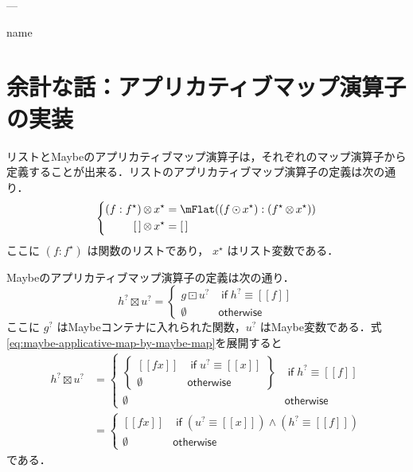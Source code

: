 \documentclass[a4paper]{jsbook}
\def\[{\left[\!\left[}
\def\]{\right]\!\right]}
\newcommand{\mMaybeWith}[1]{\[#1\]}
\newcommand{\mEmptyList}{{[\,]}}
\newcommand{\mNothing}{\emptyset}
\newcommand{\mKeyword}[1]{\mathsf{#1}}
\newcommand{\mIfKeyword}{\mKeyword{if}}
\newcommand{\mOtherwiseKeyword}{\mKeyword{otherwise}}
\newcommand{\mList}[1]{{#1}^\mathrm{\star}}
\newcommand{\mMaybe}[1]{{#1}^\text{?}}
\DeclareMathOperator{\mMapList}{\odot}
\DeclareMathOperator{\mMapMaybe}{\boxdot}
\DeclareMathOperator{\mAppMapList}{\otimes}
\DeclareMathOperator{\mAppMapMaybe}{\boxtimes}
\DeclareMathOperator{\mLogicalAnd}{\wedge}
\DeclareMathOperator{\mIf}{\mIfKeyword}
\DeclareMathOperator{\mOtherwise}{\mOtherwiseKeyword}
\begin{document}
---

name

\section{余計な話：アプリカティブマップ演算子の実装}

リストとMaybeのアプリカティブマップ演算子は，それぞれのマップ演算子から定義することが出来る．リストのアプリカティブマップ演算子の定義は次の通り．
\begin{equation}
\left\{
\begin{split}
(f:\mList{f})\mAppMapList\mList{x}&=\mFlat((f\mMapList\mList{x}):(\mList{f}\mAppMapList\mList{x}))\\
\mEmptyList\mAppMapList\mList{x}&=\mEmptyList
\end{split}
\right.
\end{equation}
ここに $(f:\mList{f})$ は関数のリストであり， $\mList{x}$ はリスト変数である．

Maybeのアプリカティブマップ演算子の定義は次の通り．
\begin{equation}
\label{eq:maybe-applicative-map-by-maybe-map}
\mMaybe{h}\mAppMapMaybe\mMaybe{u}
=\begin{cases}
g\mMapMaybe\mMaybe{u}&\mIf\mMaybe{h}\equiv\mMaybeWith{f}\\
\mNothing&\mOtherwise
\end{cases}
\end{equation}
ここに $\mMaybe{g}$ はMaybeコンテナに入れられた関数，$\mMaybe{u}$ はMaybe変数である．式\eqref{eq:maybe-applicative-map-by-maybe-map}を展開すると
\begin{align}
\mMaybe{h}\mAppMapMaybe\mMaybe{u}
&=\begin{cases}
\left\{
\begin{array}{ll}
\mMaybeWith{fx}&\mIf\mMaybe{u}\equiv\mMaybeWith{x}\\
\mNothing&\mOtherwise
\end{array}\right\}
&\mIf\mMaybe{h}\equiv\mMaybeWith{f}\\
\mNothing&\mOtherwise
\end{cases}\\
&=\begin{cases}
\mMaybeWith{fx}&\mIf\left(\mMaybe{u}\equiv\mMaybeWith{x}\right)\mLogicalAnd\left(\mMaybe{h}\equiv\mMaybeWith{f}\right)\\
\mNothing&\mOtherwise
\end{cases}
\end{align}
である．
\end{document}
